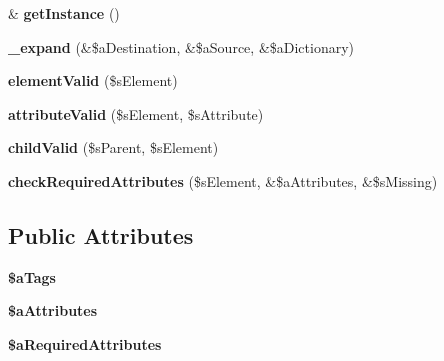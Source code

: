 \begin{DoxyCompactItemize}
\item 
\hypertarget{classclsValidator_ac5c8131a215a8943005ab282b651790f}{
\& {\bfseries getInstance} ()}
\label{classclsValidator_ac5c8131a215a8943005ab282b651790f}

\item 
\hypertarget{classclsValidator_a136befd3383ecc02e7494e518307a748}{
{\bfseries \_\-expand} (\&\$aDestination, \&\$aSource, \&\$aDictionary)}
\label{classclsValidator_a136befd3383ecc02e7494e518307a748}

\item 
\hypertarget{classclsValidator_a18014d79679b9d761ea61a9a60e6ce50}{
{\bfseries elementValid} (\$sElement)}
\label{classclsValidator_a18014d79679b9d761ea61a9a60e6ce50}

\item 
\hypertarget{classclsValidator_a22d1ffba9e945f368409aafd06e1825a}{
{\bfseries attributeValid} (\$sElement, \$sAttribute)}
\label{classclsValidator_a22d1ffba9e945f368409aafd06e1825a}

\item 
\hypertarget{classclsValidator_ad00141cb6054a23e5e9f4033b73609a4}{
{\bfseries childValid} (\$sParent, \$sElement)}
\label{classclsValidator_ad00141cb6054a23e5e9f4033b73609a4}

\item 
\hypertarget{classclsValidator_a022f10448d201d310f903c8b22202019}{
{\bfseries checkRequiredAttributes} (\$sElement, \&\$aAttributes, \&\$sMissing)}
\label{classclsValidator_a022f10448d201d310f903c8b22202019}

\end{DoxyCompactItemize}
\subsection*{Public Attributes}
\begin{DoxyCompactItemize}
\item 
\hypertarget{classclsValidator_abdf36681c63d50a935862b12af55962e}{
{\bfseries \$aTags}}
\label{classclsValidator_abdf36681c63d50a935862b12af55962e}

\item 
\hypertarget{classclsValidator_a4e35a7721efc7a68d10aa02dfd134df4}{
{\bfseries \$aAttributes}}
\label{classclsValidator_a4e35a7721efc7a68d10aa02dfd134df4}

\item 
\hypertarget{classclsValidator_a5edb6d05f373ec339fd6614961cd7349}{
{\bfseries \$aRequiredAttributes}}
\label{classclsValidator_a5edb6d05f373ec339fd6614961cd7349}

\end{DoxyCompactItemize}


